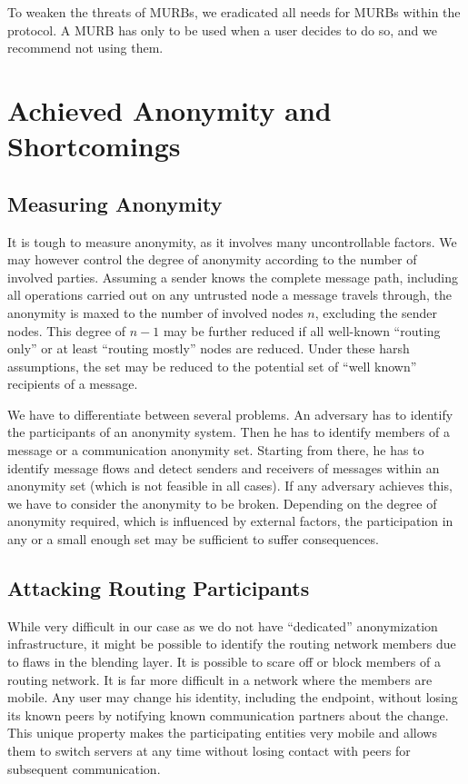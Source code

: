 To weaken the threats of MURBs, we eradicated all needs for MURBs within the protocol. A MURB has only to be used when a user decides to do so, and we recommend not using them.

\section{Achieved Anonymity and Shortcomings}
\subsection{Measuring Anonymity}
It is tough to measure anonymity, as it involves many uncontrollable factors. We may however control the degree of anonymity according to the number of involved parties. Assuming a sender knows the complete message path, including all operations carried out on any untrusted node a message travels through, the anonymity is maxed to the number of involved nodes $n$, excluding the sender nodes. This degree of $n-1$ may be further reduced if all well-known ``routing only'' or at least ``routing mostly'' nodes are reduced. Under these harsh assumptions, the set may be reduced to the potential set of ``well known'' recipients of a message.

We have to differentiate between several problems. An adversary has to identify the participants of an anonymity system. Then he has to identify members of a message or a communication anonymity set. Starting from there, he has to identify message flows and detect senders and receivers of messages within an anonymity set (which is not feasible in all cases). If any adversary achieves this, we have to consider the anonymity to be broken. Depending on the degree of anonymity required, which is influenced by external factors, the participation in any or a small enough set may be sufficient to suffer consequences.

\subsection{Attacking Routing Participants}
While very difficult in our case as we do not have ``dedicated'' anonymization infrastructure, it might be possible to identify the routing network members due to flaws in the blending layer. It is possible to scare off or block members of a routing network. It is far more difficult in a network where the members are mobile. Any user may change his identity, including the endpoint, without losing its known peers by notifying known communication partners about the change. This unique property makes the participating entities very mobile and allows them to switch servers at any time without losing contact with peers for subsequent communication.

